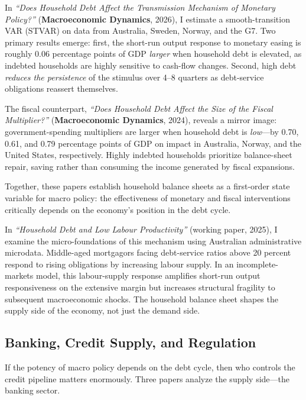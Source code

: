 \documentclass[12pt,a4paper]{article}
\begin{document}
In \textit{``Does Household Debt Affect the Transmission Mechanism of Monetary Policy?''} (\textbf{Macroeconomic Dynamics}, 2026), I estimate a smooth-transition VAR (STVAR) on data from Australia, Sweden, Norway, and the G7. Two primary results emerge: first, the short-run output response to monetary easing is roughly 0.06 percentage points of GDP \emph{larger} when household debt is elevated, as indebted households are highly sensitive to cash-flow changes. Second, high debt \emph{reduces the persistence} of the stimulus over 4--8 quarters as debt-service obligations reassert themselves.

The fiscal counterpart, \textit{``Does Household Debt Affect the Size of the Fiscal Multiplier?''} (\textbf{Macroeconomic Dynamics}, 2024), reveals a mirror image: government-spending multipliers are larger when household debt is \emph{low}---by 0.70, 0.61, and 0.79 percentage points of GDP on impact in Australia, Norway, and the United States, respectively. Highly indebted households prioritize balance-sheet repair, saving rather than consuming the income generated by fiscal expansions.

Together, these papers establish household balance sheets as a first-order state variable for macro policy: the effectiveness of monetary and fiscal interventions critically depends on the economy's position in the debt cycle.

In \textit{``Household Debt and Low Labour Productivity''} (working paper, 2025), I examine the micro-foundations of this mechanism using Australian administrative microdata. Middle-aged mortgagors facing debt-service ratios above 20 percent respond to rising obligations by increasing labour supply. In an incomplete-markets model, this labour-supply response amplifies short-run output responsiveness on the extensive margin but increases structural fragility to subsequent macroeconomic shocks. The household balance sheet shapes the supply side of the economy, not just the demand side.

\subsection*{Banking, Credit Supply, and Regulation}
\vspace{-0.3cm}

If the potency of macro policy depends on the debt cycle, then who controls the credit pipeline matters enormously. Three papers analyze the supply side---the banking sector.
\end{document}
